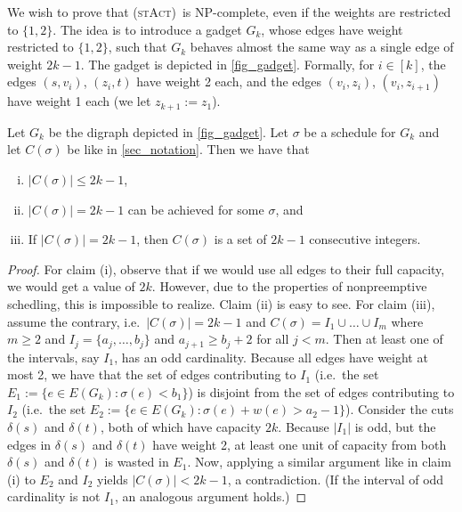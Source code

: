\documentclass[runningheads]{llncs}
\numberwithin{equation}{section}
\newcommand{\set}[1]{\{ #1 \}}
\newcommand{\fromto}[2]{\set{#1, \ldots, #2}}
\newcommand{\stact}{\textsc{(stAct)}}
\begin{document}
We wish to prove that \stact\ is NP-complete, even if the weights are restricted to $\set{1, 2}$. The idea is to introduce a gadget $G_k$, whose edges have weight restricted to $\set{1,2}$, such that $G_k$ behaves almost the same way as a single edge of weight $2k - 1$. The gadget is depicted in \cref{fig_gadget}. Formally, for $i \in [k]$, the edges $(s, v_i)$, $(z_i, t)$ have weight 2 each, and the edges $(v_i, z_i)$, $(v_i, z_{i+1})$ have weight 1 each (we let $z_{k+1} := z_1$).

\begin{lemma}
\label{lemma_gadget}
Let $G_k$ be the digraph depicted in \cref{fig_gadget}. Let $\sigma$ be a schedule for $G_k$ and let $C(\sigma)$ be like in \cref{sec_notation}. Then we have that \begin{enumerate}[(i)]
\item $|C(\sigma)| \leq 2k -1$,
\item $|C(\sigma)| = 2k -1$ can be achieved for some $\sigma$, and
\item If $|C(\sigma)| = 2k -1$, then $C(\sigma)$ is a set of $2k-1$ consecutive integers.
\label{lemma_gadget_case_3}
\end{enumerate}
\end{lemma}
\begin{proof}
For claim (i), observe that if we would use all edges to their full capacity, we would get a value of $2k$. However, due to the properties of nonpreemptive schedling, this is impossible to realize. Claim (ii) is easy to see. For claim (iii), assume the contrary, i.e.\ $|C(\sigma)| = 2k -1$ and $C(\sigma) = I_1 \cup \dots \cup I_m$ where $m \geq 2$ and $I_j = \fromto{a_j}{b_j}$ and $a_{j+1} \geq b_j + 2$ for all $j < m$. Then at least one of the intervals, say $I_1$, has an odd cardinality. Because  all edges have weight at most 2, we have that the set of edges contributing to $I_1$ (i.e.\ the set $E_1 := \set{e \in E(G_k) : \sigma(e) < b_1}$) is disjoint from the set of edges contributing to $I_2$ (i.e.\ the set $E_2 := \set{e \in E(G_k) : \sigma(e) + w(e) > a_2 - 1}$). Consider the cuts $\delta(s)$ and $\delta(t)$, both of which have capacity $2k$. Because $|I_1|$ is odd, but the edges in $\delta(s)$ and $\delta(t)$ have weight 2, at least one unit of capacity from both $\delta(s)$ and $\delta(t)$ is wasted in $E_1$. Now, applying a similar argument like in claim (i) to $E_2$ and $I_2$ yields $|C(\sigma)| < 2k - 1$, a contradiction. (If the interval of odd cardinality is not $I_1$, an analogous argument holds.)
\end{proof}
\end{document}
